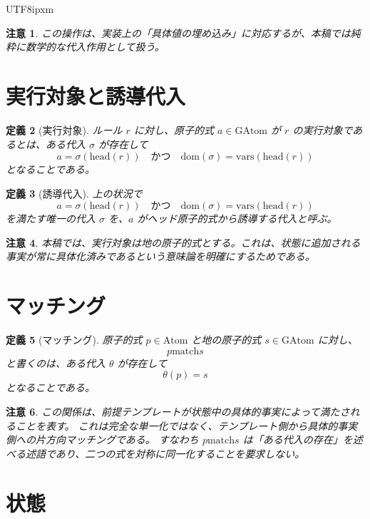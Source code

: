 \documentclass[a4paper,11pt]{bxjsarticle}
\newcommand{\JPCJKfamily}{ipxm}
\newtheorem{definition}{定義}[section]
\newtheorem{remark}[definition]{注意}
\newcommand{\Atom}{\mathrm{Atom}}
\newcommand{\GAtom}{\mathrm{GAtom}}
\newcommand{\headsym}{\mathrm{head}}
\newcommand{\dom}{\mathrm{dom}}
\newcommand{\vars}{\mathrm{vars}}
\newcommand{\matchrel}{\mathrel{\mathrm{match}}}
\begin{document}
\begin{CJK}{UTF8}{\JPCJKfamily}
\begin{remark}
この操作は、実装上の「具体値の埋め込み」に対応するが、本稿では純粋に数学的な代入作用として扱う。
\end{remark}

\section{実行対象と誘導代入}

\begin{definition}[実行対象]
ルール $r$ に対し、原子的式 $a \in \GAtom$ が $r$ の\emph{実行対象}であるとは、ある代入 $\sigma$ が存在して
\[
a = \sigma(\headsym(r))
\quad\text{かつ}\quad
\dom(\sigma)=\vars(\headsym(r))
\]
となることである。
\end{definition}

\begin{definition}[誘導代入]
上の状況で
\[
a = \sigma(\headsym(r))
\quad\text{かつ}\quad
\dom(\sigma)=\vars(\headsym(r))
\]
を満たす唯一の代入 $\sigma$ を、$a$ がヘッド原子的式から誘導する代入と呼ぶ。
\end{definition}

\begin{remark}
本稿では、実行対象は地の原子的式とする。これは、状態に追加される事実が常に具体化済みであるという意味論を明確にするためである。
\end{remark}

\section{マッチング}

\begin{definition}[マッチング]
原子的式 $p \in \Atom$ と地の原子的式 $s \in \GAtom$ に対し、
\[
p \matchrel s
\]
と書くのは、ある代入 $\theta$ が存在して
\[
\theta(p) = s
\]
となることである。
\end{definition}

\begin{remark}
この関係は、前提テンプレートが状態中の具体的事実によって満たされることを表す。
これは完全な単一化ではなく、テンプレート側から具体的事実側への片方向マッチングである。
すなわち $p \matchrel s$ は「ある代入の存在」を述べる述語であり、二つの式を対称に同一化することを要求しない。
\end{remark}

\section{状態}


\end{CJK}
\end{document}
